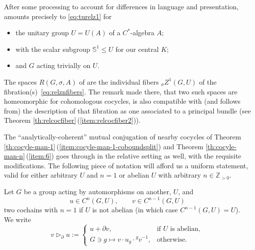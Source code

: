 \documentclass[10pt,a4paper]{amsart}
\numberwithin{equation}{section}
\newcommand\bS{{\mathbb S}}
\newcommand\bZ{{\mathbb Z}}
\begin{document}
\begin{Remark}\label{re:martinsame}
 After some processing to account for differences in language and presentation, \cite[Proposition 2.2]{mart-proj} amounts precisely to \eqref{eq:turelz1} for
 \begin{itemize}\itemsep=0pt
 \item the unitary group $U=U(A)$ of a $C^*$-algebra $A$;
 \item with the scalar subgroup $\bS^1\le U$ for our central $K$;
 \item and $G$ acting trivially on $U$.
 \end{itemize}
 The spaces $R(G,\sigma,A)$ of \cite[Section~1.4]{mart-proj} are the individual fibers ${}_{\sigma}Z^1(G,U)$ of the fibration(s)~\eqref{eq:relznfibers}. The remark made there, that two such spaces are homeomorphic for cohomologous cocycles, is also compatible with (and follows from) the description of that fibration as one associated to a principal bundle (see Theorem \ref{th:relcocfiber}\,(\ref{item:relcocfiber2})).
\end{Remark}

The ``analytically-coherent'' mutual conjugation of nearby cocycles of Theorem \ref{th:cocyle-man-1}\,(\ref{item:cocyle-man-1-coboundsplit}) and Theorem \ref{th:cocyle-man-n}\,(\ref{item:6}) goes through in the relative setting as well, with the requisite modifications. The following piece of notation will afford us a uniform statement, valid for either arbitrary $U$ and $n=1$ or abelian $U$ with arbitrary $n\in \bZ_{>0}$.

\begin{Notation}\label{not:actpart}
 Let $G$ be a group acting by automorphisms on another, $U$, and
 \begin{equation*}
 u\in C^n(G,U),\qquad v\in C^{n-1}(G,U)
 \end{equation*}
 two cochains with $n=1$ if $U$ is not abelian \big(in which case $C^{n-1}(G,U)=U$\big). We write
 \begin{equation*}
 v\triangleright_{\partial} u:=
 \begin{cases}
 u+\partial v, &\text{if $U$ is abelian},\\
 G\ni g\mapsto v\cdot u_g \cdot {}^g v^{-1}, &\text{otherwise}.
 \end{cases}
 \end{equation*}
\end{Notation}
\end{document}

